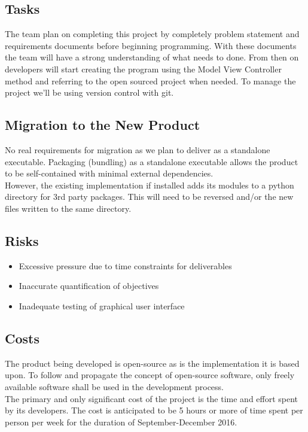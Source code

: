 \documentclass{article}
\begin{document}
		\subsection{Tasks}
		\indent The team plan on completing this project by completely problem statement and requirements documents before beginning programming. With these documents the team will have a strong understanding of what needs to done. From then on developers will start creating the program using the Model View Controller method and referring to the open sourced project when needed. To manage the project we’ll be using version control with git. \\


		\subsection{Migration to the New Product}
		\indent No real requirements for migration as we plan to deliver as a standalone executable. Packaging (bundling) as a standalone executable allows the product to be self-contained with minimal external dependencies.\\
		\indent However, the existing implementation if installed adds its modules to a python directory for 3rd party packages. This will need to be reversed and/or the new files written to the same directory.\\

		\subsection{Risks}
		\begin{itemize}
			\itemsep0em
			\item Excessive pressure due to time constraints for deliverables
			\item Inaccurate quantification of objectives
			\item Inadequate testing of graphical user interface
		\end{itemize}

		\subsection{Costs}
		\indent The product being developed is open-source as is the implementation it is based upon. To follow and propagate the concept of open-source software, only freely available software shall be used in the development process. \\
		\indent The primary and only significant cost of the project is the time and effort spent by its developers. The cost is anticipated to be 5 hours or more of time spent per person per week for the duration of September-December 2016.\\
\end{document}
